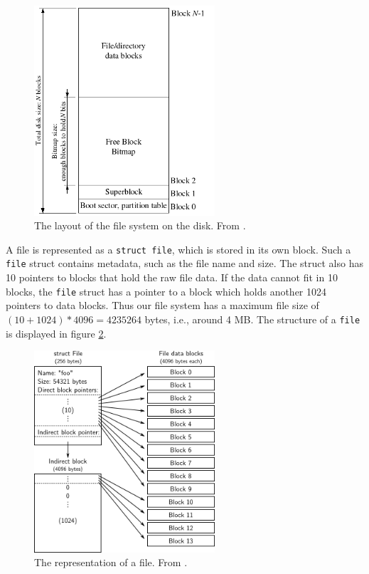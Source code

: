 \documentclass{report}
\begin{document}
\begin{figure}[h]
\centering
\includegraphics[width=0.6\textwidth]{disk}
\caption{The layout of the file system on the disk. From \cite{lab5}.}
\label{fig:disklayout}
\end{figure}

A file is represented as a \texttt{struct file}, which is stored in its own
block. Such a \texttt{file} struct contains metadata, such as the file name
and size. The struct also has 10 pointers to blocks that hold the raw file
data. If the data cannot fit in 10 blocks, the \texttt{file} struct has a
pointer to a block which holds another 1024 pointers to data blocks. Thus our
file system has a maximum file size of $(10+1024)*4096 = 4235264$ bytes, i.e.,
around 4 MB. The structure of a \texttt{file} is displayed in figure
\ref{fig:filestruct}.

\begin{figure}[h]
\centering
\includegraphics[width=0.6\textwidth]{file}
\caption{The representation of a file. From \cite{lab5}.}
\label{fig:filestruct}
\end{figure}
\end{document}
